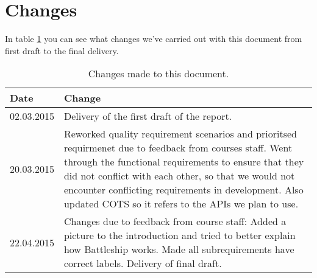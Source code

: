 \section{Changes}

In table \ref{tab:changes} you can see what changes we've  carried out with this document from first draft to the final delivery.

\begin{table}[h]
\label{tab:changes}
    \begin{center}
\begin{tabular}{|p{2cm}|p{13cm}|}
\hline
 \textbf{Date}& \textbf{Change} \\ \hline \hline
 02.03.2015 & Delivery of the first draft of the report.\\ \hline
20.03.2015 & Reworked quality requirement scenarios and prioritsed requirmenet due to feedback from courses staff. Went through  the functional requirements to ensure that they did not conflict with each other, so that we would not encounter conflicting requirements in development. Also updated COTS so it refers to the APIs we plan to use.\\ \hline 
22.04.2015 & Changes due to feedback from course staff: Added a picture to the introduction and tried to better explain how Battleship works. Made all subrequirements have correct labels.  Delivery of final draft.\\ \hline
 
 \hline

 \end{tabular}
\caption{Changes made to this document.}
\end{center}
\end{table}
